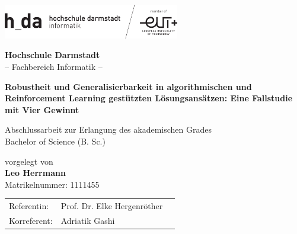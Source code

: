 \thispagestyle{empty}
\begin{titlepage}
 \begin{center}
    \includegraphics[width=7.7cm]{logo_h-da_neu} \\ 
  \end{center}

  \begin{center}
    \vspace{0.1cm}
    \huge \textbf{Hochschule Darmstadt}\\
    \vspace{0.4cm}
    \LARGE -- Fachbereich Informatik --
  \end{center}

  \vfill
  \vfill

  \begin{center}
    \LARGE \textbf{Robustheit und Generalisierbarkeit in algorithmischen und Reinforcement Learning gestützten Lösungsansätzen: Eine Fallstudie mit Vier Gewinnt}
  \end{center} 
  
  \vfill
  \vfill

  \begin{center}
	\Large Abschlussarbeit zur Erlangung des akademischen Grades\\
	\vspace{0.3cm}
	\Large Bachelor of Science (B. Sc.)\\
  \end{center}

  \vfill

  \begin{center}
    \Large vorgelegt von\\
    \vspace{0.3cm}
    \Large \textbf{Leo Herrmann}\\
    \vspace{0.3cm}
    \normalsize Matrikelnummer: 1111455
  \end{center}
    \vfill
  \vfill

  \begin{center}
    \begin{tabular}{lll}
      Referentin:    & Prof. Dr. Elke Hergenröther \\
      Korreferent: & Adriatik Gashi				 \\
    \end{tabular}
  \end{center} 
\end{titlepage}
